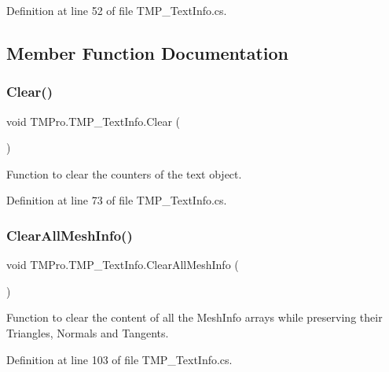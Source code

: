 Definition at line 52 of file T\+M\+P\+\_\+\+Text\+Info.\+cs.



\subsection{Member Function Documentation}
\mbox{\label{class_t_m_pro_1_1_t_m_p___text_info_a15b8c8e9f46c5412276e45c6f675edf2}} 
\subsubsection{\texorpdfstring{Clear()}{Clear()}}
{\footnotesize\ttfamily void T\+M\+Pro.\+T\+M\+P\+\_\+\+Text\+Info.\+Clear (\begin{DoxyParamCaption}{ }\end{DoxyParamCaption})}



Function to clear the counters of the text object. 



Definition at line 73 of file T\+M\+P\+\_\+\+Text\+Info.\+cs.

\mbox{\label{class_t_m_pro_1_1_t_m_p___text_info_aaf8e50d7075ed34cd7668d5df8225194}} 
\subsubsection{\texorpdfstring{ClearAllMeshInfo()}{ClearAllMeshInfo()}}
{\footnotesize\ttfamily void T\+M\+Pro.\+T\+M\+P\+\_\+\+Text\+Info.\+Clear\+All\+Mesh\+Info (\begin{DoxyParamCaption}{ }\end{DoxyParamCaption})}



Function to clear the content of all the Mesh\+Info arrays while preserving their Triangles, Normals and Tangents. 



Definition at line 103 of file T\+M\+P\+\_\+\+Text\+Info.\+cs.

\mbox{\label{class_t_m_pro_1_1_t_m_p___text_info_a8681083e478f949f5ba57d1b2f59f9bf}} 
